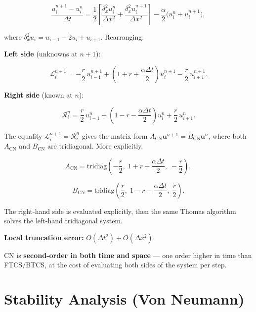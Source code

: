 \documentclass[11pt,a4paper]{article}
\begin{document}
\begin{equation}
\frac{u_i^{n+1} - u_i^n}{\Delta t} = \frac{1}{2}\left[\frac{\delta_x^2 u_i^n}{\Delta x^2} + \frac{\delta_x^2 u_i^{n+1}}{\Delta x^2}\right] - \frac{\alpha}{2}\bigl(u_i^n + u_i^{n+1}\bigr), \tag{33}
\end{equation}

where $\delta_x^2 u_i = u_{i-1} - 2u_i + u_{i+1}$. Rearranging:

\textbf{Left side} (unknowns at $n+1$):

\begin{equation}
\mathcal{L}_i^{n+1} =
-\frac{r}{2}\, u_{i-1}^{n+1} + \left(1 + r + \frac{\alpha\Delta t}{2}\right)u_i^{n+1} - \frac{r}{2}\, u_{i+1}^{n+1}. \tag{34}
\end{equation}

\textbf{Right side} (known at $n$):

\begin{equation}
\mathcal{R}_i^n =
\frac{r}{2}\, u_{i-1}^n + \left(1 - r - \frac{\alpha\Delta t}{2}\right)u_i^n + \frac{r}{2}\, u_{i+1}^n. \tag{35}
\end{equation}

The equality $\mathcal{L}_i^{n+1}=\mathcal{R}_i^n$ gives the matrix form $A_{\text{CN}}\mathbf{u}^{n+1} = B_{\text{CN}}\mathbf{u}^n$, where both $A_{\text{CN}}$ and $B_{\text{CN}}$ are tridiagonal. More explicitly,

\begin{equation}
A_{\text{CN}} = \mathrm{tridiag}\!\left(-\frac{r}{2},\; 1+r+\frac{\alpha\Delta t}{2},\; -\frac{r}{2}\right), \tag{36}
\end{equation}

\begin{equation}
B_{\text{CN}} = \mathrm{tridiag}\!\left(\frac{r}{2},\; 1-r-\frac{\alpha\Delta t}{2},\; \frac{r}{2}\right). \tag{37}
\end{equation}

The right-hand side is evaluated explicitly, then the same Thomas algorithm solves the left-hand tridiagonal system.

\textbf{Local truncation error:} $O(\Delta t^2) + O(\Delta x^2)$.

CN is \textbf{second-order in both time and space} — one order higher in time than FTCS/BTCS, at the cost of evaluating both sides of the system per step.

\section{Stability Analysis (Von Neumann)}
\end{document}
